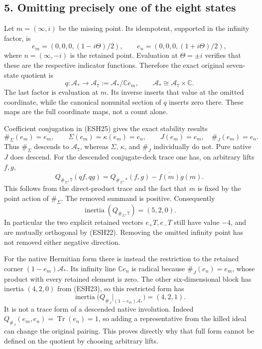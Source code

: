 \documentclass[
  10pt,
  a4paper,
]{article}
\begin{document}
\subsection{5. Omitting precisely one of the eight
states}\label{omitting-precisely-one-of-the-eight-states}

Let \(m=(\infty,i)\) be the missing point. Its idempotent, supported in
the infinity factor, is \[
e_m=(0,0,0,(1-i\Theta)/2),\qquad
e_n=(0,0,0,(1+i\Theta)/2),
\tag{ESH25}
\] where \(n=(\infty,-i)\) is the retained point. Evaluation at
\(\Theta=\pm i\) verifies that these are the respective indicator
functions. Therefore the exact original seven-state quotient is \[
q:\mathcal A_*\longrightarrow\mathcal A_7:=\mathcal A_*/\mathbb Ce_m,
\qquad
\mathcal A_*\cong\mathcal A_7\times\mathbb C.
\tag{ESH26}
\] The last factor is evaluation at \(m\). Its inverse inserts that
value at the omitted coordinate, while the canonical nonunital section
of \(q\) inserts zero there. These maps are the full coordinate maps,
not a count alone.

Coefficient conjugation in (ESH25) gives the exact stability results \[
\#_\Sigma(e_m)=e_m,\qquad
\Sigma(e_m)=\kappa(e_m)=e_n,
\qquad J(e_m)=e_m,\quad \#_J(e_m)=e_n.
\tag{ESH27}
\] Thus \(\#_\Sigma\) descends to \(\mathcal A_7\), whereas \(\Sigma\),
\(\kappa\), and \(\#_J\) individually do not. Pure native \(J\) does
descend. For the descended conjugate-deck trace one has, on arbitrary
lifts \(f,g\), \[
Q_{\#_\Sigma,7}(qf,qg)
=Q_{\#_\Sigma,*}(f,g)-\overline{f(m)}g(m).
\tag{ESH28}
\] This follows from the direct-product trace and the fact that \(m\) is
fixed by the point action of \(\#_\Sigma\). The removed summand is
positive. Consequently \[
\operatorname{inertia}(Q_{\#_\Sigma,7})=(5,2,0).
\tag{ESH29}
\] In particular the two explicit retained vectors \(e_+T,e_-T\) still
have value \(-4\), and are mutually orthogonal by (ESH22). Removing the
omitted infinity point has not removed either negative direction.

For the native Hermitian form there is instead the restriction to the
retained corner \((1-e_m)\mathcal A_*\). Its infinity line
\(\mathbb Ce_n\) is radical because \(\#_J(e_n)=e_m\), whose product
with every retained element is zero. The other six-dimensional block has
inertia \((4,2,0)\) from (ESH23), so this restricted form has \[
\operatorname{inertia}
\bigl(Q_{\#_J}|_{(1-e_m)\mathcal A_*}\bigr)=(4,2,1).
\tag{ESH30}
\] It is not a trace form of a descended native involution. Indeed
\(Q_{\#_J}(e_m,e_n)=\operatorname{Tr}(e_n)=1\), so adding a
representative from the killed ideal can change the original pairing.
This proves directly why that full form cannot be defined on the
quotient by choosing arbitrary lifts.
\end{document}
